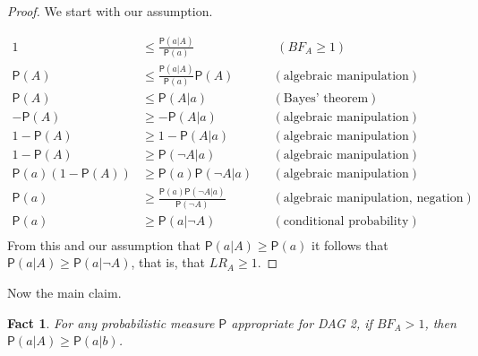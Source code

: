 \documentclass[
  10pt,
  dvipsnames,enabledeprecatedfontcommands]{scrartcl}
\newtheorem{fact}{Fact}
\newcommand{\n}{\neg}
\newcommand{\pr}[1]{\ensuremath{\mathsf{P}(#1)}}
\begin{document}
\begin{proof} We start with our assumption.


\begin{align*}
1 & \leq \frac{\pr{a \vert A}}{\pr{a}} & &  \,\, (BF_A \geq 1) \\
\pr{A} & \leq  \frac{\pr{a \vert A}}{\pr{a}} \pr{A} & & (\mbox{algebraic manipulation}) \\
\pr{A} & \leq \pr{A \vert a} & &  (\mbox{Bayes' theorem})  \\
- \pr{A} &\geq - \pr{A \vert a} &  &   (\mbox{algebraic manipulation}) \\
1- \pr{A} & \geq 1 - \pr{A \vert a} & & (\mbox{algebraic manipulation})\\
1- \pr{A}  & \geq \pr{\n A \vert a} & & (\mbox{algebraic manipulation})\\
\pr{a}\left( 1 - \pr{A}\right) & \geq \pr{a}\pr{\n A \vert a}  & & (\mbox{algebraic manipulation})\\
\pr{a} & \geq \frac{\pr{a} \pr{\n A \vert a}}{\pr{\n A}} &  & (\mbox{algebraic manipulation, negation}) \\
\pr{a} & \geq \pr{a \vert \n A}  & &   (\mbox{conditional probability}) \\
\end{align*}
From this and our assumption  that $\pr{a \vert A} \geq \pr{a}$ it follows that $\pr{a \vert A}\geq \pr{a \vert \n A}$, that is, that \mbox{$LR_A \geq 1$}.
\end{proof}

Now the main claim.

\begin{fact}
For any probabilistic measure $\mathsf{P}$ appropriate for \textsf{DAG 2}, if $BF_A >1$, then $\pr{a \vert A} \geq \pr{a \vert b}$.
\end{fact}
\end{document}
